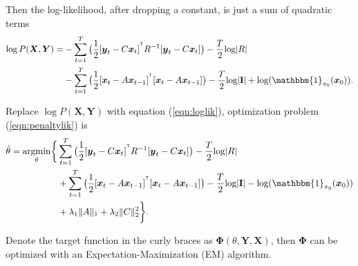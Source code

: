\documentclass[fleqn,12pt]{article}
\let\oldref\ref
\renewcommand{\ref}[1]{(\oldref{#1})}
\newcommand{\T}{^{\ensuremath{\mathsf{T}}}}           %
\newcommand{\argmin}{\operatornamewithlimits{argmin}}
\providecommand{\mb}[1]{\boldsymbol{#1}}
\newcommand{\bx}{\mb{x}}
\newcommand{\by}{\mb{y}}
\newcommand{\bX}{\mb{X}}
\newcommand{\bY}{\mb{Y}}
\begin{document}
Then the log-likelihood, after dropping a constant, is just a sum of quadratic terms
\begin{equation}\label{eqn:loglik}
\begin{split}
\log  P(\bX,\bY)=&-\sum\limits_{t=1}^{T}\big(\frac{1}{2}[\by_t-C\bx_t]^{\T}R^{-1}[\by_t-C\bx_t]\big)-\frac{T}{2}\text{log}|R|\\
&-\sum\limits_{t=1}^{T}\big(\frac{1}{2}[\bx_t-A\bx_{t-1}]^{\T}[\bx_t-A\bx_{t-1}]\big)-\frac{T}{2}\text{log}|\mathbf{I}|+ \text{log}(\mathbbm{1}_{\mathbf{\pi}_0}(\bx_0)).
\end{split}
\end{equation}

Replace $\log  P(\bX,\bY)$ with equation \ref{eqn:loglik}, optimization problem \ref{eqn:penaltylik} is
\begin{equation}\label{eqn:penaltylik2}
\begin{split}
\hat{\theta}=\argmin_{\substack{\theta}}\biggl\{&\sum\limits_{t=1}^{T}\big(\frac{1}{2}[\by_t-C\bx_t]^{\T}R^{-1}[\by_t-C\bx_t]\big)-\frac{T}{2}\text{log}|R|\\
&+\sum\limits_{t=1}^{T}\big(\frac{1}{2}[\bx_t-A\bx_{t-1}]^{\T}[\bx_t-A\bx_{t-1}]\big)-\frac{T}{2}\text{log}|\mathbf{I}| - \text{log}(\mathbbm{1}_{\mathbf{\pi}_0}(\bx_0))\\
&+\lambda_1\|A\|_1+\lambda_2\|C\|_2^2\biggr\}.
\end{split}
\end{equation}

Denote the target function in the curly braces  as $\mathbf{\Phi}(\theta,\bY,\bX)$, then $\mathbf{\Phi}$ can be optimized with an Expectation-Maximization (EM) algorithm.
\end{document}
